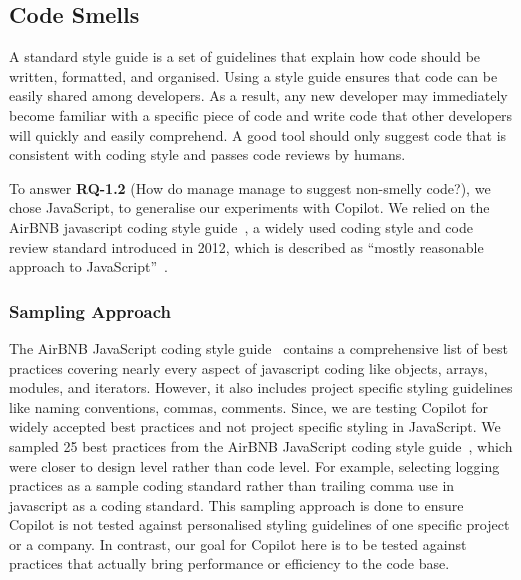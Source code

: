 \subsection{Code Smells}
\label{smells}
A standard style guide is a set of guidelines that explain how code should be written, formatted, and organised. 
Using a style guide ensures that code can be easily shared among developers. As a result, any new developer may immediately become familiar with a specific piece of code and write code that other developers will quickly and easily comprehend.
A good \cct{} tool should only suggest code that is consistent with coding style and passes code reviews by humans. 

To answer \textbf{RQ-1.2} (How do \cct{} manage manage to suggest non-smelly code?), we chose JavaScript, to generalise our experiments with Copilot. 
We relied on the AirBNB javascript coding style guide~\cite{airbnb_code}, a widely used coding style and code review standard introduced in 2012, which is described as ``mostly reasonable approach to JavaScript''~\cite{airbnb_code}.



\subsubsection{Sampling Approach}
\label{smells:sampling}
The AirBNB JavaScript coding style guide~\cite{airbnb_code} contains a comprehensive list of best practices covering nearly every aspect of javascript coding like objects, arrays, modules, and iterators. However, it also includes project specific styling guidelines like naming conventions, commas, comments.
Since, we are testing Copilot for widely accepted best practices and not project specific styling in JavaScript. 
We sampled 25 best practices from the AirBNB JavaScript coding style guide~\cite{airbnb_code}, 
which were closer to design level rather than code level. For example, selecting logging practices as a sample coding standard rather than trailing comma use in javascript as a coding standard. 
This sampling approach is done to ensure Copilot is not tested against personalised styling guidelines of one specific project or a company. In contrast, our goal for Copilot here is to be tested against practices that actually bring performance or efficiency to the code base.

